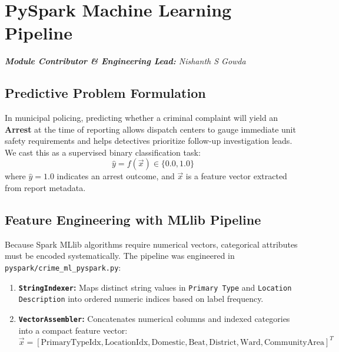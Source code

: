 \documentclass[11pt,a4paper]{article}
\begin{document}
\section{PySpark Machine Learning Pipeline}
\noindent\textit{\textbf{Module Contributor \& Engineering Lead:} Nishanth S Gowda}

\subsection{Predictive Problem Formulation}
In municipal policing, predicting whether a criminal complaint will yield an \textbf{Arrest} at the time of reporting allows dispatch centers to gauge immediate unit safety requirements and helps detectives prioritize follow-up investigation leads. We cast this as a supervised binary classification task:
\begin{equation}
    \hat{y} = f(\vec{x}) \in \{0.0, 1.0\}
\end{equation}
where $\hat{y} = 1.0$ indicates an arrest outcome, and $\vec{x}$ is a feature vector extracted from report metadata.

\subsection{Feature Engineering with MLlib Pipeline}
Because Spark MLlib algorithms require numerical vectors, categorical attributes must be encoded systematically. The pipeline was engineered in \texttt{pyspark/crime\_ml\_pyspark.py}:
\begin{enumerate}
    \item \textbf{\texttt{StringIndexer}:} Maps distinct string values in \texttt{Primary Type} and \texttt{Location Description} into ordered numeric indices based on label frequency.
    \item \textbf{\texttt{VectorAssembler}:} Concatenates numerical columns and indexed categories into a compact feature vector:
    \begin{equation}
        \vec{x} = [\text{PrimaryTypeIdx}, \text{LocationIdx}, \text{Domestic}, \text{Beat}, \text{District}, \text{Ward}, \text{CommunityArea}]^T
    \end{equation}
\end{enumerate}
\end{document}
